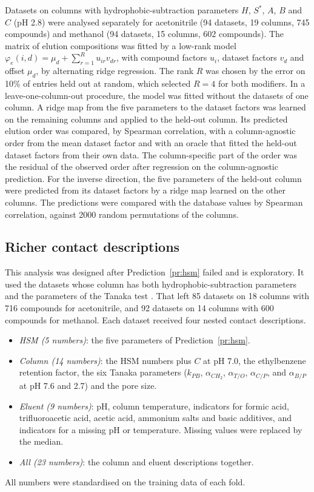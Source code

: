 \documentclass[11pt,a4paper]{article}
\theoremstyle{definition}
\theoremstyle{remark}
\begin{document}
Datasets on columns with hydrophobic-subtraction parameters $H$, $S^\ast$, $A$, $B$ and $C$ (pH 2.8) were analysed separately for acetonitrile (94 datasets, 19 columns, 745 compounds) and methanol (94 datasets, 15 columns, 602 compounds).
The matrix of elution compositions was fitted by a low-rank model $\varphi_e(i,d)=\mu_d+\sum_{r=1}^{R}u_{ir}v_{dr}$, with compound factors $u_i$, dataset factors $v_d$ and offset $\mu_d$, by alternating ridge regression.
The rank $R$ was chosen by the error on 10\% of entries held out at random, which selected $R=4$ for both modifiers.
In a leave-one-column-out procedure, the model was fitted without the datasets of one column.
A ridge map from the five parameters to the dataset factors was learned on the remaining columns and applied to the held-out column.
Its predicted elution order was compared, by Spearman correlation, with a column-agnostic order from the mean dataset factor and with an oracle that fitted the held-out dataset factors from their own data.
The column-specific part of the order was the residual of the observed order after regression on the column-agnostic prediction.
For the inverse direction, the five parameters of the held-out column were predicted from its dataset factors by a ridge map learned on the other columns.
The predictions were compared with the database values by Spearman correlation, against 2000 random permutations of the columns.

\subsection{Richer contact descriptions}
\label{sec:rich-methods}

This analysis was designed after Prediction~\ref{pr:hsm} failed and is exploratory.
It used the datasets whose column has both hydrophobic-subtraction parameters and the parameters of the Tanaka test \citep{kimata1989}.
That left 85 datasets on 18 columns with 716 compounds for acetonitrile, and 92 datasets on 14 columns with 600 compounds for methanol.
Each dataset received four nested contact descriptions.
\begin{itemize}
\item \emph{HSM (5 numbers)}: the five parameters of Prediction~\ref{pr:hsm}.
\item \emph{Column (14 numbers)}: the HSM numbers plus $C$ at pH 7.0, the ethylbenzene retention factor, the six Tanaka parameters ($k_{PB}$, $\alpha_{CH_2}$, $\alpha_{T/O}$, $\alpha_{C/P}$, and $\alpha_{B/P}$ at pH 7.6 and 2.7) and the pore size.
\item \emph{Eluent (9 numbers)}: pH, column temperature, indicators for formic acid, trifluoroacetic acid, acetic acid, ammonium salts and basic additives, and indicators for a missing pH or temperature.
Missing values were replaced by the median.
\item \emph{All (23 numbers)}: the column and eluent descriptions together.
\end{itemize}
All numbers were standardised on the training data of each fold.
\end{document}
